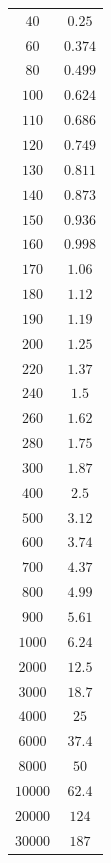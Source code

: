 \begin{figure}
\begin{subfigure}{0.49\textwidth}
\begin{tabular}{S S }
    {$\num{40}$} & {$\num{0.25}$} \\
    {$\num{60}$} & {$\num{0.374}$} \\
    {$\num{80}$} & {$\num{0.499}$} \\
    {$\num{100}$} & {$\num{0.624}$} \\
    {$\num{110}$} &{$\num{0.686}$} \\
    {$\num{120}$} &{$\num{0.749}$} \\
    {$\num{130}$} & {$\num{0.811}$} \\
    {$\num{140}$} &{$\num{0.873}$} \\
    {$\num{150}$} &{$\num{0.936}$} \\
    {$\num{160}$} &{$\num{0.998}$} \\
    {$\num{170}$} &{$\num{1.06}$} \\
    {$\num{180}$} &{$\num{1.12}$}\\
    {$\num{190}$} &{$\num{1.19}$}\\
    {$\num{200}$} &{$\num{1.25}$}\\
    {$\num{220}$} &{$\num{1.37}$}\\
    {$\num{240}$} &{$\num{1.5}$}\\
    {$\num{260}$} &{$\num{1.62}$}\\
    {$\num{280}$} &{$\num{1.75}$}\\
    {$\num{300}$} &{$\num{1.87}$}\\
    {$\num{400}$} &{$\num{2.5}$}\\
    {$\num{500}$} &{$\num{3.12}$}\\
    {$\num{600}$} &{$\num{3.74}$}\\
    {$\num{700}$} &{$\num{4.37}$}\\
    {$\num{800}$} &{$\num{4.99}$}\\
    {$\num{900}$} &{$\num{5.61}$}\\
    {$\num{1000}$} &{$\num{6.24}$}\\
    {$\num{2000}$} &{$\num{12.5}$}\\
    {$\num{3000}$} &{$\num{18.7}$}\\
    {$\num{4000}$} &{$\num{25}$}\\
    {$\num{6000}$} &{$\num{37.4}$}\\
    {$\num{8000}$} &{$\num{50}$}\\
    {$\num{10000}$} &{$\num{62.4}$}\\
    {$\num{20000}$} &{$\num{124}$}\\
    {$\num{30000}$} &{$\num{187}$}\\
     \bottomrule
  \end{tabular}
 \end{subfigure}
\end{figure}


